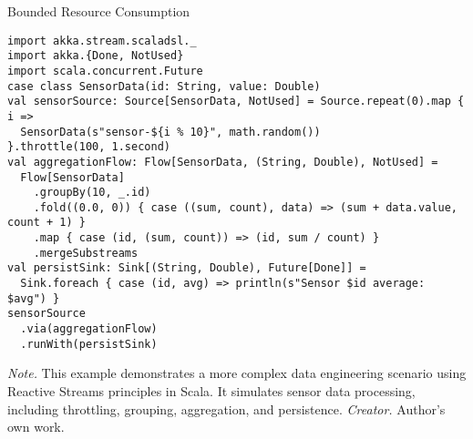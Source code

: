 \begin{table}[H]
\caption{Bounded Resource Consumption}
\begin{lstlisting}
import akka.stream.scaladsl._
import akka.{Done, NotUsed}
import scala.concurrent.Future
case class SensorData(id: String, value: Double)
val sensorSource: Source[SensorData, NotUsed] = Source.repeat(0).map { i =>
  SensorData(s"sensor-${i % 10}", math.random())
}.throttle(100, 1.second)
val aggregationFlow: Flow[SensorData, (String, Double), NotUsed] = 
  Flow[SensorData]
    .groupBy(10, _.id)
    .fold((0.0, 0)) { case ((sum, count), data) => (sum + data.value, count + 1) }
    .map { case (id, (sum, count)) => (id, sum / count) }
    .mergeSubstreams
val persistSink: Sink[(String, Double), Future[Done]] = 
  Sink.foreach { case (id, avg) => println(s"Sensor $id average: $avg") }
sensorSource
  .via(aggregationFlow)
  .runWith(persistSink)
\end{lstlisting}
\small
\textit{Note.} This example demonstrates a more complex data engineering scenario using Reactive Streams principles in Scala. It simulates sensor data processing, including throttling, grouping, aggregation, and persistence.
\textit{Creator.} Author's own work.
\end{table}